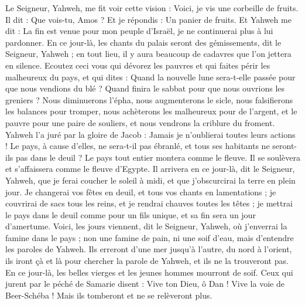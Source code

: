 \begin{multicols}{2}
\VerseOne{}Le Seigneur, Yahweh, me fit voir cette vision : Voici, je vis une corbeille de fruits.
Il dit : Que vois-tu, Amos ? Et je répondis : Un panier de fruits. Et Yahweh me dit : La fin est venue pour mon peuple d'Israël, je ne continuerai plus à lui pardonner.
En ce jour-là, les chants du palais seront des gémissements, dit le Seigneur, Yahweh ; en tout lieu, il y aura beaucoup de cadavres que l'on jettera en silence.
Ecoutez ceci vous qui dévorez les pauvres et qui faites périr les malheureux du pays,
et qui dites : Quand la nouvelle lune sera-t-elle passée pour que nous vendions du blé ? Quand finira le sabbat pour que nous ouvrions les greniers ? Nous diminuerons l’épha, nous augmenterons le sicle, nous falsifierons les balances pour tromper,
nous achèterons les malheureux pour de l’argent, et le pauvre pour une paire de souliers, et nous vendrons la criblure du froment.
Yahweh l’a juré par la gloire de Jacob : Jamais je n’oublierai toutes leurs actions !
Le pays, à cause d’elles, ne sera-t-il pas ébranlé, et tous ses habitants ne seront-ils pas dans le deuil ? Le pays tout entier montera comme le fleuve. Il se soulèvera et s’affaissera comme le fleuve d'Egypte.
Il arrivera en ce jour-là, dit le Seigneur, Yahweh, que je ferai coucher le soleil à midi, et que j’obscurcirai la terre en plein jour.
Je changerai vos fêtes en deuil, et tous vos chants en lamentations ; je couvrirai de sacs tous les reins, et je rendrai chauves toutes les têtes ; je mettrai le pays dans le deuil comme pour un fils unique, et sa fin sera un jour d’amertume.
Voici, les jours viennent, dit le Seigneur, Yahweh, où j'enverrai la famine dans le pays ; non une famine de pain, ni une soif d'eau, mais d’entendre les paroles de Yahweh.
Ils erreront d’une mer jusqu'à l'autre, du nord à l'orient, ils iront çà et là pour chercher la parole de Yahweh, et ils ne la trouveront pas.
En ce jour-là, les belles vierges et les jeunes hommes mourront de soif.
Ceux qui jurent par le péché de Samarie disent : Vive ton Dieu, ô Dan ! Vive la voie de Beer-Schéba ! Mais ils tomberont et ne se relèveront plus.
\end{multicols}
